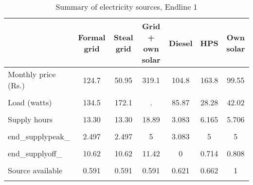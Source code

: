 \begin{table}[htbp]\centering
\caption{Summary of electricity sources, Endline 1}
\begin{tabular}{l*{6}{c}}
\toprule
                &Formal grid&Steal grid&Grid + own solar&   Diesel&      HPS&Own solar\\
\midrule
Monthly price (Rs.)&    124.7&    50.95&    319.1&    104.8&    163.8&    99.55\\
                &         &         &         &         &         &         \\
\addlinespace
Load (watts)    &    134.5&    172.1&        .&    85.87&    28.28&    42.02\\
                &         &         &         &         &         &         \\
\addlinespace
Supply hours    &    13.30&    13.30&    18.89&    3.083&    6.165&    5.706\\
                &         &         &         &         &         &         \\
\addlinespace
end\_supplypeak\_ &    2.497&    2.497&        5&    3.083&        5&        5\\
                &         &         &         &         &         &         \\
\addlinespace
end\_supplyoff\_  &    10.62&    10.62&    11.42&        0&    0.714&    0.808\\
                &         &         &         &         &         &         \\
\addlinespace
Source available&    0.591&    0.591&    0.591&    0.621&    0.662&        1\\
                &         &         &         &         &         &         \\
\bottomrule
\end{tabular}
\end{table}
